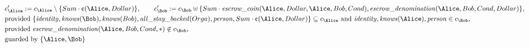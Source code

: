 \begin{align*}
&
c'_
{
\Alice
}
 := 
c_
{
\Alice
}
 \setminus 
\{
Sum
\cdot
\text{\textcent}
(
\Alice
,
Dollar
)
\}
, \qquad 
c'_
{
\Bob
}
 := 
c_
{
\Bob
}
 \uplus 
\{
Sum
\cdot
\mathit{\detokenize{
escrow_coin
}}
(
\Alice
,
Dollar
,
\Alice
,
Bob
,
Cond
)
,
\mathit{\detokenize{
escrow_denomination
}}
(
\Alice
,
Bob
,
Cond
,
Dollar
)
\}
,\\
&
\text{provided } 
\{
\mathit{\detokenize{
identity
}}
,
\mathit{\detokenize{
knows
}}
(
\Bob
)
,
\mathit{\detokenize{
knows
}}
(
Bob
)
,
\mathit{\detokenize{
all_stay_backed
}}
(
Orga
)
,
\mathit{\detokenize{
person
}}
,
Sum
\cdot
\text{\textcent}
(
\Alice
,
Dollar
)
\}
 \subseteq c_
{
\Alice
}
 \text{ and } 
\mathit{\detokenize{
identity
}}
,
\mathit{\detokenize{
knows
}}
(
\Alice
)
,
\mathit{\detokenize{
person
}}
 \in c_
{
\Bob
}
,\\
&
\text{provided } 
\mathit{\detokenize{
escrow_denomination
}}
(
\Alice
,
Bob
,
Cond
,
\ast
)
 \notin c_
{
\Bob
}
,\\
&
\text{guarded by } \{
\Alice
,
\Bob
\}
\end{align*}

